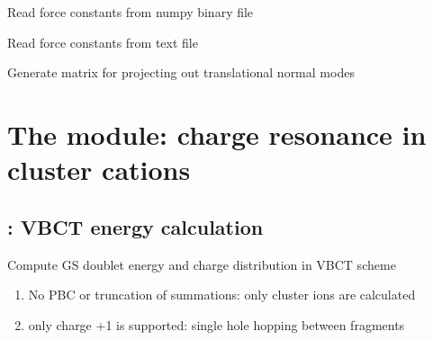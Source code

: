 \documentclass[letterpaper,10pt,english]{sphinxmanual}
\begin{document}

\begin{fulllineitems}
\label{\detokenize{tools:tools.phonon.read_force_consts_np}}
Read force constants from numpy binary file

\end{fulllineitems}


\begin{fulllineitems}
\label{\detokenize{tools:tools.phonon.read_force_consts_txt}}
Read force constants from text file

\end{fulllineitems}


\begin{fulllineitems}
\label{\detokenize{tools:tools.phonon.smoothing_matrix}}
Generate matrix for projecting out translational normal modes

\end{fulllineitems}



\section{The  module: charge resonance in cluster cations}
\label{\detokenize{vbct::doc}}\label{\detokenize{vbct:the-vbct-module-charge-resonance-in-cluster-cations}}

\subsection{: VBCT energy calculation}
\label{\detokenize{vbct:module-vbct.energy}}\label{\detokenize{vbct:energy-vbct-energy-calculation}}
Compute GS doublet energy and charge distribution in VBCT scheme
\begin{enumerate}
\item {} 
No PBC or truncation of summations: only cluster ions are calculated

\item {} 
only charge +1 is supported: single hole hopping between fragments

\end{enumerate}
\end{document}

